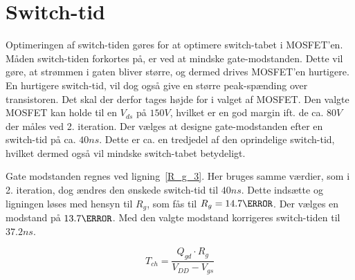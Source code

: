 
\section{Switch-tid} \label{sec:switch_tid}
Optimeringen af switch-tiden gøres for at optimere switch-tabet i MOSFET'en. Måden switch-tiden forkortes på, er ved at mindske gate-modstanden. Dette vil gøre, at strømmen i gaten bliver større, og dermed drives MOSFET'en hurtigere. En hurtigere switch-tid, vil dog også give en større peak-spænding over transistoren. Det skal der derfor tages højde for i valget af MOSFET. Den valgte MOSFET kan holde til en $V_{ds}$ på $150V$, hvilket er en god margin ift. de ca. $80V$ der måles ved 2. iteration. Der vælges at designe gate-modstanden efter en switch-tid på ca. $40ns$. Dette er ca. en tredjedel af den oprindelige switch-tid, hvilket dermed også vil mindske switch-tabet betydeligt. 

Gate modstanden regnes ved ligning~\ref{R_g_3}\cite{gate_res}. Her bruges samme værdier, som i 2. iteration, dog ændres den ønskede switch-tid til $40ns$. Dette indsætte og ligningen løses med hensyn til $R_{g}$, som fås til $R_{g}=14.7\ohm$. Der vælges en modstand på $13.7\ohm$. Med den valgte modstand korrigeres switch-tiden til $37.2ns$.

\begin{equation} \label{R_g_3}
T_{ch} = \frac{Q_{gd} \cdot R_{g}}{V_{DD}-V_{gs}}
\end{equation}

 